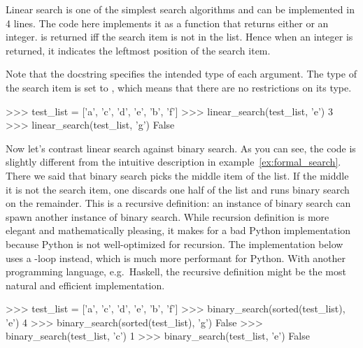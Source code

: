 Linear search is one of the simplest search algorithms and can be implemented in 4 lines.
The code here implements it as a function that returns either  or an integer.
 is returned iff the search item is not in the list.
Hence when an integer is returned, it indicates the leftmost position of the search item.

Note that the docstring specifies the intended type of each argument.
The type of the search item is set to , which means that there are no restrictions on its type.

\begin{center}
\end{center}
\begin{center}
    \begin{pythoncode}
        >>> test_list = ['a', 'c', 'd', 'e', 'b', 'f']
        >>> linear_search(test_list, 'e')
        3
        >>> linear_search(test_list, 'g')
        False
    \end{pythoncode}
\end{center}



Now let's contrast linear search against binary search.
As you can see, the code is slightly different from the intuitive description in example~\ref{ex:formal_search}.
There we said that binary search picks the middle item of the list.
If the middle it is not the search item, one discards one half of the list and runs binary search on the remainder.
This is a recursive definition: an instance of binary search can spawn another instance of binary search.
While recursion definition is more elegant and mathematically pleasing, it makes for a bad Python implementation because Python is not well-optimized for recursion.
The implementation below uses a -loop instead, which is much more performant for Python.
With another programming language, e.g.~Haskell, the recursive definition might be the most natural and efficient implementation.

\begin{center}
\end{center}
\begin{center}
    \begin{pythoncode}
    >>> test_list = ['a', 'c', 'd', 'e', 'b', 'f']
    >>> binary_search(sorted(test_list), 'e')
    4
    >>> binary_search(sorted(test_list), 'g')
    False
    >>> binary_search(test_list, 'c')
    1
    >>> binary_search(test_list, 'e')
    False
    \end{pythoncode}
\end{center}

